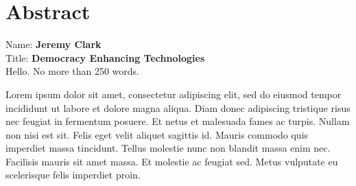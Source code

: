 
\chapter*{Abstract}

Name: 	\tab \textbf{Jeremy Clark} \\
Title: 	\tab \textbf{Democracy Enhancing Technologies}\\

Hello. No more than 250 words.

Lorem ipsum dolor sit amet, consectetur adipiscing elit, sed do eiusmod tempor incididunt ut labore et dolore magna aliqua. Diam donec adipiscing tristique risus nec feugiat in fermentum posuere. Et netus et malesuada fames ac turpis. Nullam non nisi est sit. Felis eget velit aliquet sagittis id. Mauris commodo quis imperdiet massa tincidunt. Tellus molestie nunc non blandit massa enim nec. Facilisis mauris sit amet massa. Et molestie ac feugiat sed. Metus vulputate eu scelerisque felis imperdiet proin.



